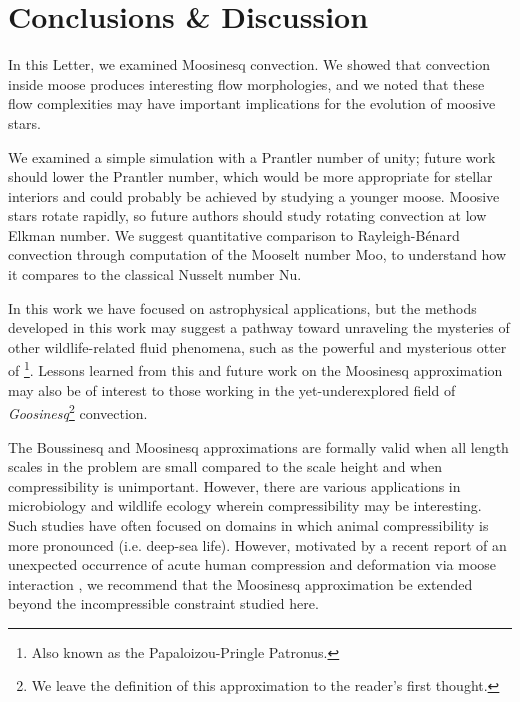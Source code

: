 \section{Conclusions \& Discussion}
\label{sec:conclusions}

In this Letter, we examined Moosinesq convection.
We showed that convection inside moose produces interesting flow morphologies, and we noted that these flow complexities may have important implications for the evolution of moosive stars.

We examined a simple simulation with a Prantler number of unity; future work should lower the Prantler number, which would be more appropriate for stellar interiors \citep{garaud_2021} and could probably be achieved by studying a younger moose.
Moosive stars rotate rapidly, so future authors should study rotating convection at low Elkman number.
We suggest quantitative comparison to Rayleigh-B\'{e}nard convection through computation of the Mooselt number Moo, to understand how it compares to the classical Nusselt number Nu.

In this work we have focused on astrophysical applications, but the methods developed in this work may suggest a pathway toward unraveling the mysteries of other wildlife-related fluid phenomena, such as the powerful and mysterious otter of \cite{Schwab2021}\footnote{Also known as the Papaloizou-Pringle Patronus.}.
Lessons learned from this and future work on the Moosinesq approximation may also be of interest to those working in the yet-underexplored field of \textit{Goosinesq}\footnote{We leave the definition of this approximation to the reader's first thought.} convection.

The Boussinesq and Moosinesq approximations are formally valid when all length scales in the problem are small compared to the scale height and when compressibility is unimportant.
However, there are various applications in microbiology \citep{Ravetto2014} and wildlife ecology \citep[e.g.][]{Enright1963} wherein compressibility may be interesting.
Such studies have often focused on domains in which animal compressibility is more pronounced (i.e. deep-sea life).
However, motivated by a recent report of an unexpected occurrence of acute human compression and deformation via moose interaction \citep{Gudmannsson2018}, we recommend that the Moosinesq approximation be extended beyond the incompressible constraint studied here.



